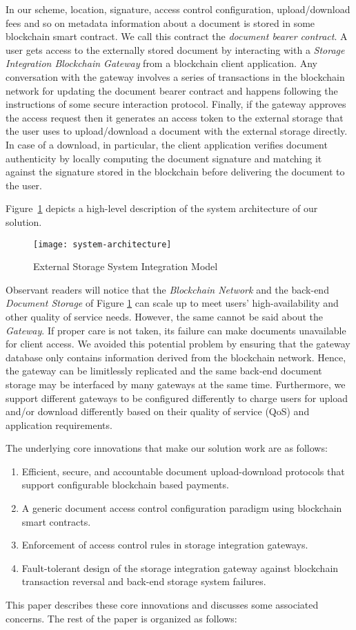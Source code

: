 In our scheme, location, signature, access control configuration, upload/download fees and so on metadata information about a document is stored in some blockchain smart contract. We call this contract the {\it document bearer contract}. A user gets access to the externally stored document by interacting with a \textit{Storage Integration Blockchain Gateway} from a blockchain client application. Any conversation with the gateway involves a series of transactions in the blockchain network for updating the document bearer contract and happens following the instructions of some secure interaction protocol. Finally, if the gateway approves the access request then it generates an access token to the external storage that the user uses to upload/download a document with the external storage directly. In case of a download, in particular, the client application verifies document authenticity by locally computing the document signature and matching it against the signature stored in the blockchain before delivering the document to the user. 

Figure~\ref{fig-1} depicts a high-level description of the system architecture of our solution.   
\begin{figure}[h]
\centering
\texttt{[image: system-architecture]}                    
\caption{External Storage System Integration Model}\label{fig-1}
\end{figure}
Observant readers will notice that the \textit{Blockchain Network} and the back-end \textit{Document Storage} of Figure \ref{fig-1} can scale up to meet users' high-availability and other quality of service needs. However, the same cannot be said about the \textit{Gateway}. If proper care is not taken, its failure can make documents unavailable for client access. We avoided this potential problem by ensuring that the gateway database only contains information derived from the blockchain network. Hence, the gateway can be limitlessly replicated and the same back-end document storage may be interfaced by many gateways at the same time. Furthermore, we support different gateways to be configured differently to charge users for upload and/or download differently based on their quality of service (QoS) and application requirements.

The underlying core innovations that make our solution work are as follows:
\begin{enumerate}
\item Efficient, secure, and accountable document upload-download protocols that support configurable blockchain based payments.
\item A generic document access control configuration paradigm using blockchain smart contracts. 
\item Enforcement of access control rules in storage integration gateways.
\item Fault-tolerant design of the storage integration gateway against blockchain transaction reversal and back-end storage system failures.   
\end{enumerate}         
This paper describes these core innovations and discusses some associated concerns. The rest of the paper is organized as follows:

